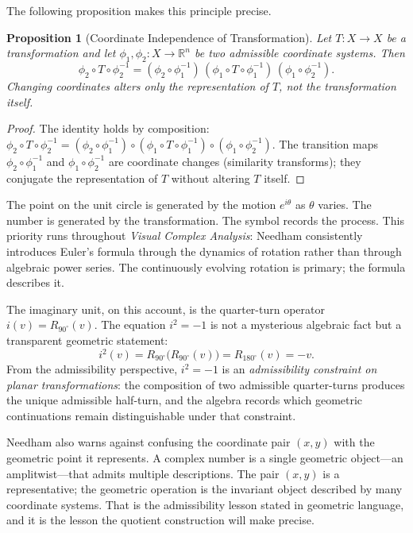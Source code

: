 \documentclass[12pt]{article}
\newtheorem{proposition}[theorem]{Proposition}
\begin{document}
The following proposition makes this principle precise.

\begin{proposition}[Coordinate Independence of Transformation]
\label{prop:coord-indep}
Let $T \colon X \to X$ be a transformation and let $\phi_1, \phi_2 \colon X \to \mathbb{R}^n$ be two admissible coordinate systems. Then
\[
\phi_2 \circ T \circ \phi_2^{-1}
=
(\phi_2 \circ \phi_1^{-1})\,
(\phi_1 \circ T \circ \phi_1^{-1})\,
(\phi_1 \circ \phi_2^{-1}).
\]
Changing coordinates alters only the representation of $T$, not the transformation itself.
\end{proposition}

\begin{proof}
The identity holds by composition:
$\phi_2 \circ T \circ \phi_2^{-1}
= (\phi_2 \circ \phi_1^{-1}) \circ (\phi_1 \circ T \circ \phi_1^{-1}) \circ (\phi_1 \circ \phi_2^{-1})$.
The transition maps $\phi_2 \circ \phi_1^{-1}$ and $\phi_1 \circ \phi_2^{-1}$ are coordinate changes (similarity transforms); they conjugate the representation of $T$ without altering $T$ itself.
\end{proof}

The point on the unit circle is generated by the motion $e^{i\theta}$ as $\theta$ varies. The number is generated by the transformation. The symbol records the process. This priority runs throughout \emph{Visual Complex Analysis}: Needham consistently introduces Euler's formula through the dynamics of rotation rather than through algebraic power series. The continuously evolving rotation is primary; the formula describes it.

The imaginary unit, on this account, is the quarter-turn operator $i(v) = R_{90^\circ}(v)$. The equation $i^2 = -1$ is not a mysterious algebraic fact but a transparent geometric statement:
\[
i^2(v) = R_{90^\circ}\bigl(R_{90^\circ}(v)\bigr) = R_{180^\circ}(v) = -v.
\]
From the admissibility perspective, $i^2 = -1$ is an \emph{admissibility constraint on planar transformations}: the composition of two admissible quarter-turns produces the unique admissible half-turn, and the algebra records which geometric continuations remain distinguishable under that constraint.

Needham also warns against confusing the coordinate pair $(x, y)$ with the geometric point it represents. A complex number is a single geometric object---an amplitwist---that admits multiple descriptions. The pair $(x, y)$ is a representative; the geometric operation is the invariant object described by many coordinate systems. That is the admissibility lesson stated in geometric language, and it is the lesson the quotient construction will make precise.
\end{document}
